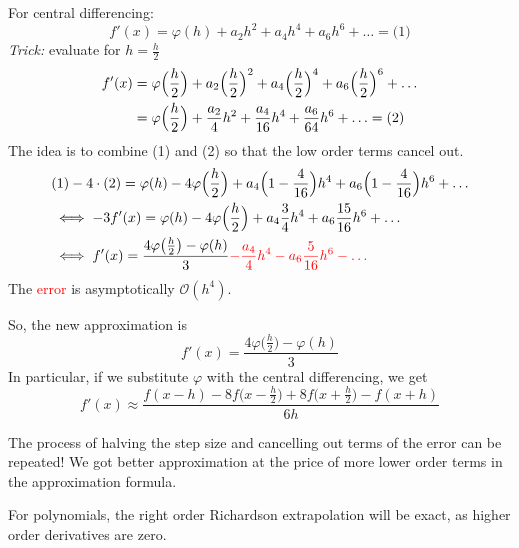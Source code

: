 \begin{example}
    For central differencing:
    \[ f'(x) = \varphi(h) + a_2 h^2 + a_4 h^4 + a_6 h^6 + \ldots = \text{(1)} \]
    \textit{Trick:} evaluate for $h = \frac{h}{2}$
    \begin{align*}
        f'(x) &= \varphi\Bigl(\frac{h}{2}\Bigr) + a_2 \Bigl(\frac{h}{2}\Bigr)^2 + 
        a_4 \Bigl(\frac{h}{2}\Bigr)^4 + a_6 \Bigl(\frac{h}{2}\Bigr)^6 + \dots
        \\&
        = \varphi\Bigl(\frac{h}{2}\Bigr) + \frac{a_2}{4} h^2 + \frac{a_4}{16} h^4 + \frac{a_6}{64} h^6 + \ldots
        = \text{(2)}
    \end{align*}
    The idea is to combine (1) and (2) so that the low order terms cancel out.
    \begin{align*}
        &\text{(1)} - 4 \cdot \text{(2)} =
        \varphi(h) - 4 \varphi\Bigl(\frac{h}{2}\Bigr) + a_4\Bigl(1 - \frac{4}{16}\Bigr) h^4 + 
        a_6 \Bigl(1 - \frac{4}{16}\Bigr) h^6 + \dots
        \\&\iff
        -3f'(x) = \varphi(h) - 4 \varphi\Bigl(\frac{h}{2}\Bigr) + a_4 \frac{3}{4} h^4 + a_6 \frac{15}{16} h^6 + \dots
        \\&\iff
        f'(x) = \frac{4 \varphi\bigl(\frac{h}{2}\bigr) - \varphi(h)}{3} \textcolor{red}{- \frac{a_4}{4} h^4 - 
        a_6 \frac{5}{16} h^6 - \dots}
    \end{align*}
    The \textcolor{red}{error} is asymptotically $\mathcal{O}(h^4)$.

    So, the new approximation is
    \[ f'(x) =  \frac{4 \varphi\bigl(\frac{h}{2}\bigr) - \varphi(h)}{3} \]
    In particular, if we substitute $\varphi$ with the
    central differencing, we get
    \[
         f'(x) \approx \frac{f(x-h) - 8f\bigl(x - \frac{h}{2}\bigr) + 
         8f\bigl(x + \frac{h}{2}\bigr) - f(x+h)}{6h}
    \]
\end{example}

The process of halving the step size and cancelling out terms of the error
can be repeated!
We got better approximation at the price of more lower order terms in 
the approximation formula.

For polynomials, the right order Richardson extrapolation will be exact,
as higher order derivatives are zero.

